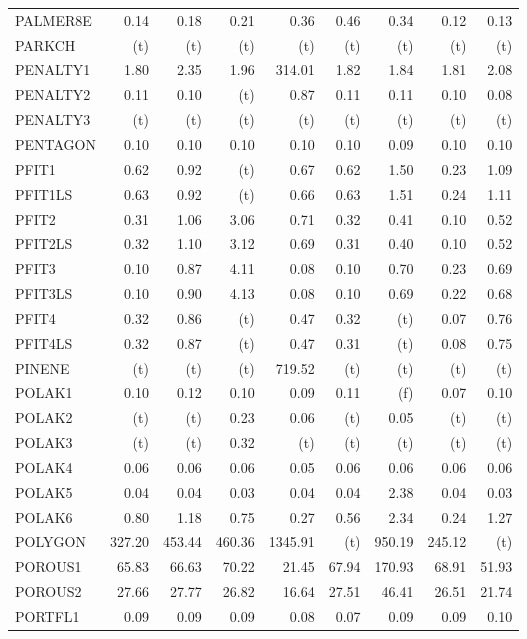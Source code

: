 \documentclass[11pt,twoside]{article}
\begin{document}
{\begin{longtable}[c]{|l|r|r|r|r|r|r|r|r|}
PALMER8E & 0.14 & 0.18 & 0.21 & 0.36 & 0.46 & 0.34 & 0.12 & 0.13 \\
PARKCH & (t) & (t) & (t) & (t) & (t) & (t) & (t) & (t) \\
PENALTY1 & 1.80 & 2.35 & 1.96 & 314.01 & 1.82 & 1.84 & 1.81 & 2.08 \\
PENALTY2 & 0.11 & 0.10 & (t) & 0.87 & 0.11 & 0.11 & 0.10 & 0.08 \\
PENALTY3 & (t) & (t) & (t) & (t) & (t) & (t) & (t) & (t) \\
PENTAGON & 0.10 & 0.10 & 0.10 & 0.10 & 0.10 & 0.09 & 0.10 & 0.10 \\
PFIT1 & 0.62 & 0.92 & (t) & 0.67 & 0.62 & 1.50 & 0.23 & 1.09 \\
PFIT1LS & 0.63 & 0.92 & (t) & 0.66 & 0.63 & 1.51 & 0.24 & 1.11 \\
PFIT2 & 0.31 & 1.06 & 3.06 & 0.71 & 0.32 & 0.41 & 0.10 & 0.52 \\
PFIT2LS & 0.32 & 1.10 & 3.12 & 0.69 & 0.31 & 0.40 & 0.10 & 0.52 \\
PFIT3 & 0.10 & 0.87 & 4.11 & 0.08 & 0.10 & 0.70 & 0.23 & 0.69 \\
PFIT3LS & 0.10 & 0.90 & 4.13 & 0.08 & 0.10 & 0.69 & 0.22 & 0.68 \\
PFIT4 & 0.32 & 0.86 & (t) & 0.47 & 0.32 & (t) & 0.07 & 0.76 \\
PFIT4LS & 0.32 & 0.87 & (t) & 0.47 & 0.31 & (t) & 0.08 & 0.75 \\
PINENE & (t) & (t) & (t) & 719.52 & (t) & (t) & (t) & (t) \\
POLAK1 & 0.10 & 0.12 & 0.10 & 0.09 & 0.11 & (f) & 0.07 & 0.10 \\
POLAK2 & (t) & (t) & 0.23 & 0.06 & (t) & 0.05 & (t) & (t) \\
POLAK3 & (t) & (t) & 0.32 & (t) & (t) & (t) & (t) & (t) \\
POLAK4 & 0.06 & 0.06 & 0.06 & 0.05 & 0.06 & 0.06 & 0.06 & 0.06 \\
POLAK5 & 0.04 & 0.04 & 0.03 & 0.04 & 0.04 & 2.38 & 0.04 & 0.03 \\
POLAK6 & 0.80 & 1.18 & 0.75 & 0.27 & 0.56 & 2.34 & 0.24 & 1.27 \\
POLYGON & 327.20 & 453.44 & 460.36 & 1345.91 & (t) & 950.19 & 245.12 & (t) \\
POROUS1 & 65.83 & 66.63 & 70.22 & 21.45 & 67.94 & 170.93 & 68.91 & 51.93 \\
POROUS2 & 27.66 & 27.77 & 26.82 & 16.64 & 27.51 & 46.41 & 26.51 & 21.74 \\
PORTFL1 & 0.09 & 0.09 & 0.09 & 0.08 & 0.07 & 0.09 & 0.09 & 0.10 \\

\end{longtable}}
\end{document}
